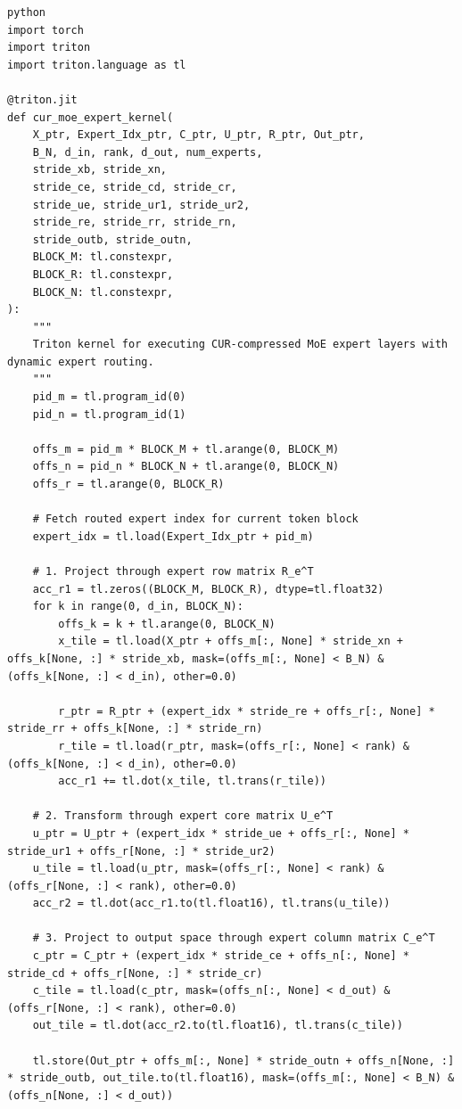 \vspace{0.5em}
\begin{mdframed}[backgroundcolor=codebg, linecolor=codeframe, linewidth=1pt, roundcorner=4pt, innerleftmargin=2pt, innerrightmargin=5pt, innertopmargin=5pt, innerbottommargin=5pt]
\begin{lstlisting}
python
import torch
import triton
import triton.language as tl

@triton.jit
def cur_moe_expert_kernel(
    X_ptr, Expert_Idx_ptr, C_ptr, U_ptr, R_ptr, Out_ptr,
    B_N, d_in, rank, d_out, num_experts,
    stride_xb, stride_xn,
    stride_ce, stride_cd, stride_cr,
    stride_ue, stride_ur1, stride_ur2,
    stride_re, stride_rr, stride_rn,
    stride_outb, stride_outn,
    BLOCK_M: tl.constexpr,
    BLOCK_R: tl.constexpr,
    BLOCK_N: tl.constexpr,
):
    """
    Triton kernel for executing CUR-compressed MoE expert layers with dynamic expert routing.
    """
    pid_m = tl.program_id(0)
    pid_n = tl.program_id(1)

    offs_m = pid_m * BLOCK_M + tl.arange(0, BLOCK_M)
    offs_n = pid_n * BLOCK_N + tl.arange(0, BLOCK_N)
    offs_r = tl.arange(0, BLOCK_R)

    # Fetch routed expert index for current token block
    expert_idx = tl.load(Expert_Idx_ptr + pid_m)

    # 1. Project through expert row matrix R_e^T
    acc_r1 = tl.zeros((BLOCK_M, BLOCK_R), dtype=tl.float32)
    for k in range(0, d_in, BLOCK_N):
        offs_k = k + tl.arange(0, BLOCK_N)
        x_tile = tl.load(X_ptr + offs_m[:, None] * stride_xn + offs_k[None, :] * stride_xb, mask=(offs_m[:, None] < B_N) & (offs_k[None, :] < d_in), other=0.0)
        
        r_ptr = R_ptr + (expert_idx * stride_re + offs_r[:, None] * stride_rr + offs_k[None, :] * stride_rn)
        r_tile = tl.load(r_ptr, mask=(offs_r[:, None] < rank) & (offs_k[None, :] < d_in), other=0.0)
        acc_r1 += tl.dot(x_tile, tl.trans(r_tile))

    # 2. Transform through expert core matrix U_e^T
    u_ptr = U_ptr + (expert_idx * stride_ue + offs_r[:, None] * stride_ur1 + offs_r[None, :] * stride_ur2)
    u_tile = tl.load(u_ptr, mask=(offs_r[:, None] < rank) & (offs_r[None, :] < rank), other=0.0)
    acc_r2 = tl.dot(acc_r1.to(tl.float16), tl.trans(u_tile))

    # 3. Project to output space through expert column matrix C_e^T
    c_ptr = C_ptr + (expert_idx * stride_ce + offs_n[:, None] * stride_cd + offs_r[None, :] * stride_cr)
    c_tile = tl.load(c_ptr, mask=(offs_n[:, None] < d_out) & (offs_r[None, :] < rank), other=0.0)
    out_tile = tl.dot(acc_r2.to(tl.float16), tl.trans(c_tile))

    tl.store(Out_ptr + offs_m[:, None] * stride_outn + offs_n[None, :] * stride_outb, out_tile.to(tl.float16), mask=(offs_m[:, None] < B_N) & (offs_n[None, :] < d_out))
\end{lstlisting}
\end{mdframed}
\vspace{0.5em}


